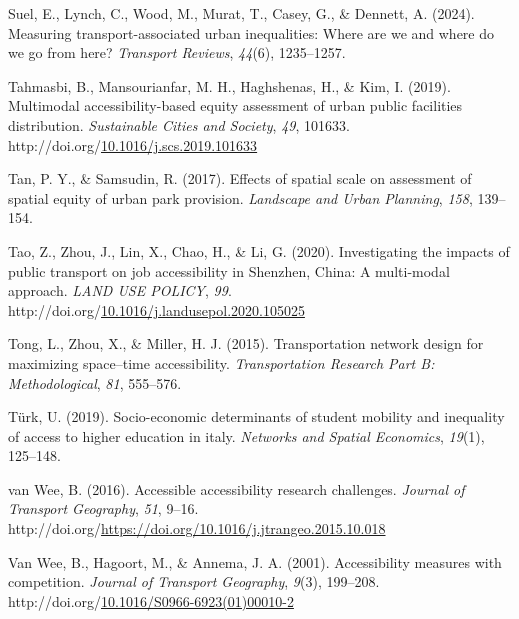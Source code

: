 \documentclass[
11pt, %
oneside, %
english, %
singlespacing, %
]{macthesis} %
\newlength{\cslhangindent}
\newenvironment{CSLReferences}[2] %
{\begin{list}{}{%
	\setlength{\itemindent}{0pt}
	\setlength{\leftmargin}{0pt}
	\setlength{\parsep}{0pt}
	\ifodd #1
	\setlength{\leftmargin}{\cslhangindent}
	\setlength{\itemindent}{-1\cslhangindent}
	\fi
	\setlength{\itemsep}{#2\baselineskip}}}
{\end{list}}
\begin{document}
\begin{CSLReferences}{1}{0}
Suel, E., Lynch, C., Wood, M., Murat, T., Casey, G., \& Dennett, A. (2024). Measuring transport-associated urban inequalities: Where are we and where do we go from here? \emph{Transport Reviews}, \emph{44}(6), 1235--1257.

Tahmasbi, B., Mansourianfar, M. H., Haghshenas, H., \& Kim, I. (2019). Multimodal accessibility-based equity assessment of urban public facilities distribution. \emph{Sustainable Cities and Society}, \emph{49}, 101633. http://doi.org/\href{https://doi.org/10.1016/j.scs.2019.101633}{10.1016/j.scs.2019.101633}

Tan, P. Y., \& Samsudin, R. (2017). Effects of spatial scale on assessment of spatial equity of urban park provision. \emph{Landscape and Urban Planning}, \emph{158}, 139--154.

Tao, Z., Zhou, J., Lin, X., Chao, H., \& Li, G. (2020). Investigating the impacts of public transport on job accessibility in {Shenzhen}, {China}: A multi-modal approach. \emph{LAND USE POLICY}, \emph{99}. http://doi.org/\href{https://doi.org/10.1016/j.landusepol.2020.105025}{10.1016/j.landusepol.2020.105025}

Tong, L., Zhou, X., \& Miller, H. J. (2015). Transportation network design for maximizing space--time accessibility. \emph{Transportation Research Part B: Methodological}, \emph{81}, 555--576.

Türk, U. (2019). Socio-economic determinants of student mobility and inequality of access to higher education in italy. \emph{Networks and Spatial Economics}, \emph{19}(1), 125--148.

van Wee, B. (2016). Accessible accessibility research challenges. \emph{Journal of Transport Geography}, \emph{51}, 9--16. http://doi.org/\url{https://doi.org/10.1016/j.jtrangeo.2015.10.018}

Van Wee, B., Hagoort, M., \& Annema, J. A. (2001). Accessibility measures with competition. \emph{Journal of Transport Geography}, \emph{9}(3), 199--208. http://doi.org/\href{https://doi.org/10.1016/S0966-6923(01)00010-2}{10.1016/S0966-6923(01)00010-2}


\end{CSLReferences}
\end{document}
